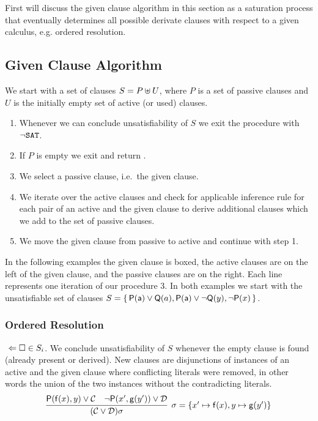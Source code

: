 First will discuss the given clause algorithm in this section
as a saturation process that eventually determines all possible derivate clauses
with respect to a given calculus, e.g. ordered resolution.

\subsection{Given Clause Algorithm}

\begin{procedure}
	We start with a set of clauses $S = P \uplus U$, 
	where $P$ is a set of {\myem passive} clauses 
	and $U$ is the initially empty set of {\myem active} (or used) clauses.
	\begin{enumerate}
		\item[\jek] Whenever we can conclude unsatisfiability of $S$ 
		we exit the procedure with $\lnot\texttt{SAT}$.
		\setcounter{enumi}{0}
		\item If $P$ is empty we exit and return \SAT.
		\item We select a passive clause, i.e.~the given clause. \jek
		\item We iterate over the active clauses and check for applicable inference rule
		for each pair of an active and the given clause
		to derive additional clauses which we add to the set of passive clauses. \jek
		\item We move the given clause from passive to active and continue with step 1.
	\end{enumerate}
\end{procedure}


In the following examples the given clause is boxed, 
the active clauses are on the left of the given clause, 
and the passive clauses are on the right. 
Each line represents one iteration of our procedure 3.
%
In both examples we start with the unsatisfiable set of clauses $S=\{\, {\mathsf P}({\mathsf a})\lor{\mathsf Q}(a), {\mathsf P}({\mathsf a})\lor\lnot{\mathsf Q}(y), \lnot{\mathsf P}(x) \,\}$.

\subsubsection{Ordered Resolution}

\jek$\ \Leftarrow\square\in S_i$. We conclude unsatisfiability of $S$ whenever the empty clause is found (already present or derived).
New clauses are disjunctions of instances of an active and the given clause where conflicting literals were removed, 
in other words the union of the two instances without the contradicting literals.
\begin{gather*}
\infer[\sigma=\{ x'\mapsto\mf(x), y\mapsto\mg(y') \}]{
	(\mcC \lor \mcD)\sigma
}{
	\mP(\mf(x), y) \lor \mcC & \lnot\mP(x',\mg(y')) \lor \mcD
}
\end{gather*}

